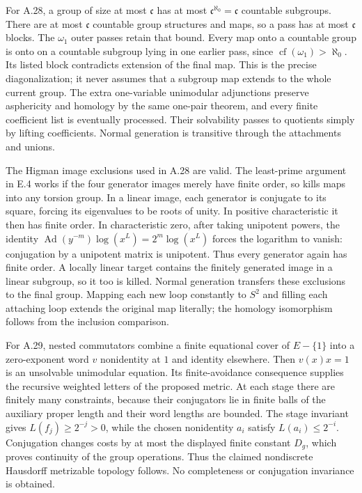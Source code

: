 For A.28, a group of size at most $\mathfrak c$ has at
most $\mathfrak c^{\aleph_0}=\mathfrak c$ countable
subgroups. There are at most $\mathfrak c$ countable
group structures and maps, so a pass has at most
$\mathfrak c$ blocks. The $\omega_1$ outer passes
retain that bound. Every map onto a countable group
is onto on a countable subgroup lying in one earlier
pass, since $\operatorname{cf}(\omega_1)>\aleph_0$.
Its listed block contradicts extension of the final
map. This is the precise diagonalization; it never
assumes that a subgroup map extends to the whole
current group. The extra one-variable unimodular
adjunctions preserve asphericity and homology by the
same one-pair theorem, and every finite coefficient
list is eventually processed. Their solvability
passes to quotients simply by lifting coefficients.
Normal generation is transitive through the
attachments and unions.

The Higman image exclusions used in A.28 are valid.
The least-prime argument in E.4 works if the four
generator images merely have finite order, so kills
maps into any torsion group. In a linear image,
each generator is conjugate to its square, forcing
its eigenvalues to be roots of unity. In positive
characteristic it then has finite order. In
characteristic zero, after taking unipotent powers,
the identity
$\operatorname{Ad}(y^{-m})\log(x^L)=2^m\log(x^L)$
forces the logarithm to vanish: conjugation by a
unipotent matrix is unipotent. Thus every generator
again has finite order. A locally linear target
contains the finitely generated image in a linear
subgroup, so it too is killed. Normal generation
transfers these exclusions to the final group.
Mapping each new loop constantly to $S^2$ and
filling each attaching loop extends the original
map literally; the homology isomorphism follows
from the inclusion comparison.

For A.29, nested commutators combine a finite
equational cover of $E-\{1\}$ into a zero-exponent
word $v$ nonidentity at $1$ and identity elsewhere.
Then $v(x)x=1$ is an unsolvable unimodular equation.
Its finite-avoidance consequence supplies the
recursive weighted letters of the proposed metric.
At each stage there are finitely many constraints,
because their conjugators lie in finite balls of
the auxiliary proper length and their word lengths
are bounded. The stage invariant gives
$L(f_j)\geq2^{-j}>0$, while the chosen nonidentity
$a_i$ satisfy $L(a_i)\leq2^{-i}$. Conjugation
changes costs by at most the displayed finite
constant $D_g$, which proves continuity of the
group operations. Thus the claimed nondiscrete
Hausdorff metrizable topology follows. No
completeness or conjugation invariance is obtained.

